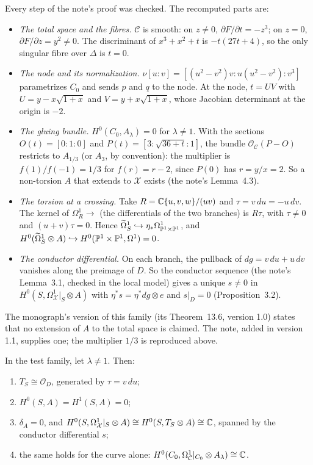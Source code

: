 Every step of the note's proof was checked. The recomputed parts are:
\begin{itemize}
\item \emph{The total space and the fibres.} $\mathcal C$ is smooth: on $z\ne0$, $\partial F/\partial t=-z^3$; on $z=0$, $\partial F/\partial z=y^2\ne0$. The discriminant of $x^3+x^2+t$ is $-t(27t+4)$, so the only singular fibre over $\Delta$ is $t=0$.
\item \emph{The node and its normalization.} $\nu[u:v]=[(u^2-v^2)v:u(u^2-v^2):v^3]$ parametrizes $C_0$ and sends $p$ and $q$ to the node. At the node, $t=UV$ with $U=y-x\sqrt{1+x}$ and $V=y+x\sqrt{1+x}$, whose Jacobian determinant at the origin is $-2$.
\item \emph{The gluing bundle.} $H^0(C_0,A_\lambda)=0$ for $\lambda\ne1$. With the sections $O(t)=[0:1:0]$ and $P(t)=[3:\sqrt{36+t}:1]$, the bundle $\mathcal O_{\mathcal C}(P-O)$ restricts to $A_{1/3}$ (or $A_3$, by convention): the multiplier is $f(1)/f(-1)=1/3$ for $f(r)=r-2$, since $P(0)$ has $r=y/x=2$. So a non-torsion $A$ that extends to $\mathcal X$ exists (the note's Lemma~4.3).
\item \emph{The torsion at a crossing.} Take $R=\mathbb{C}\{u,v,w\}/(uv)$ and $\tau=v\,du=-u\,dv$. The kernel of $\Omega^1_R\to$ (the differentials of the two branches) is $R\tau$, with $\tau\neq0$ and $(u+v)\tau=0$. Hence $\widetilde\Omega^1_S\hookrightarrow\eta_*\Omega^1_{\mathbb{P}^1\times\mathbb{P}^1}$, and $H^0(\widetilde\Omega^1_S\otimes A)\hookrightarrow H^0(\mathbb{P}^1\times\mathbb{P}^1,\Omega^1)=0$.
\item \emph{The conductor differential.} On each branch, the pullback of $dg=v\,du+u\,dv$ vanishes along the preimage of $D$. So the conductor sequence (the note's Lemma~3.1, checked in the local model) gives a unique $s\neq0$ in $H^0(S,\Omega^1_{\mathcal X}|_S\otimes A)$ with $\eta^*s=\eta^*dg\otimes e$ and $s|_D=0$ (Proposition~3.2).
\end{itemize}

The monograph's version of this family (its Theorem~13.6, version 1.0) states that no extension of $A$ to the total space is claimed. The note, added in version 1.1, supplies one; the multiplier $1/3$ is reproduced above.

\begin{proposition}\label{prop:sharp}
In the test family, let $\lambda\neq1$. Then:
\begin{enumerate}[label=\textup{(\alph*)}]
\item $T_S\cong\mathcal O_D$, generated by $\tau=v\,du$;
\item $H^0(S,A)=H^1(S,A)=0$;
\item $\delta_A=0$, and $H^0(S,\Omega^1_{\mathcal X}|_S\otimes A)\cong H^0(S,T_S\otimes A)\cong\mathbb{C}$, spanned by the conductor differential $s$;
\item the same holds for the curve alone: $H^0(C_0,\Omega^1_{\mathcal C}|_{C_0}\otimes A_\lambda)\cong\mathbb{C}$.
\end{enumerate}
\end{proposition}

